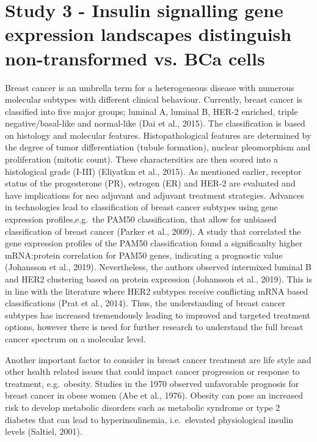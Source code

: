 \documentclass[12pt,openany]{book}
\begin{document}
\section{Study 3 - Insulin signalling gene expression landscapes distinguish non-transformed vs. BCa cells}

Breast cancer is an umbrella term for a heterogeneous disease with
numerous molecular subtypes with different clinical behaviour.
Currently, breast cancer is classified into five major groups; luminal
A, luminal B, HER-2 enriched, triple negative/basal-like and normal-like
(Dai et al., 2015). The classification is based on histology and
molecular features. Histopathological features are determined by the
degree of tumor differentiation (tubule formation), nuclear pleomorphism
and proliferation (mitotic count). These charactersitics are then scored
into a histological grade (I-III) (Eliyatkın et al., 2015). As mentioned
earlier, receptor status of the progesterone (PR), estrogen (ER) and
HER-2 are evaluated and have implications for neo adjuvant and adjuvant
treatment strategies. Advances in technologies lead to classification of
breast cancer subtypes using gene expression profiles,e.g.~the PAM50
classification, that allow for unbiased classification of breast cancer
(Parker et al., 2009). A study that correlated the gene expression
profiles of the PAM50 classification found a significanlty higher
mRNA:protein correlation for PAM50 genes, indicating a prognostic value
(Johansson et al., 2019). Nevertheless, the authors observed intermixed
luminal B and HER2 clustering based on protein expression (Johansson et
al., 2019). This is in line with the literature where HER2 subtypes
receive conflicting mRNA based classifications (Prat et al., 2014).
Thus, the understanding of breast cancer subtypes has increased
tremendously leading to improved and targeted treatment options, however
there is need for further research to understand the full breast cancer
spectrum on a molecular level.

Another important factor to consider in breast cancer treatment are life
style and other health related issues that could impact cancer
progression or response to treatment, e.g.~obesity. Studies in the 1970
observed unfavorable prognosis for breast cancer in obese women (Abe et
al., 1976). Obesity can pose an increased risk to develop metabolic
disorders such as metabolic syndrome or type 2 diabetes that can lead to
hyperinsulinemia, i.e.~elevated physiological insulin levels (Saltiel,
2001).
\end{document}
